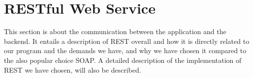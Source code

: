 \section{RESTful Web Service}
\label{sec:rest}

This section is about the communication between the application and the backend. It entails a description of REST overall and how it is directly related to our program and the demands we have, and why we have chosen it compared to the also popular choice SOAP. A detailed description of the implementation of REST we have chosen, will also be described. 



